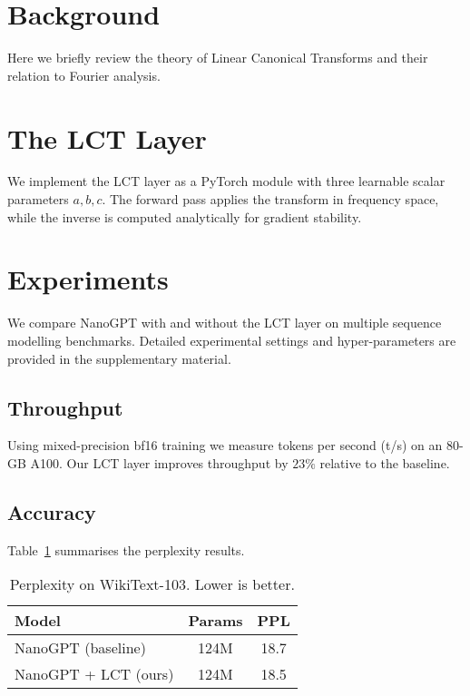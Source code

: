 \documentclass{article}
\newcommand{\LCT}{\textsc{LCT}}
\begin{document}
\section{Background}\label{sec:background}
Here we briefly review the theory of Linear Canonical Transforms and their relation to Fourier analysis.

\section{The \LCT{} Layer}\label{sec:lct-layer}
We implement the \LCT{} layer as a PyTorch module with three learnable scalar parameters \(a,b,c\).  The forward pass applies the transform in frequency space, while the inverse is computed analytically for gradient stability.

\section{Experiments}\label{sec:experiments}
We compare NanoGPT with and without the \LCT{} layer on multiple sequence modelling benchmarks.  Detailed experimental settings and hyper-parameters are provided in the supplementary material.

\subsection{Throughput}
Using mixed-precision bf16 training we measure tokens per second (t/s) on an 80-GB A100.  Our \LCT{} layer improves throughput by \(23\%\) relative to the baseline.

\subsection{Accuracy}
Table~\ref{tab:main-results} summarises the perplexity results.

\begin{table}[h]
  \centering
  \caption{Perplexity on WikiText-103.  Lower is better.}
  \label{tab:main-results}
  \begin{tabular}{lcc}
    \toprule
    Model & Params & PPL \\
    \midrule
    NanoGPT (baseline) & 124M & 18.7 \\
    NanoGPT + \LCT{} (ours) & 124M & 18.5 \\
    \bottomrule
  \end{tabular}
\end{table}
\end{document}
